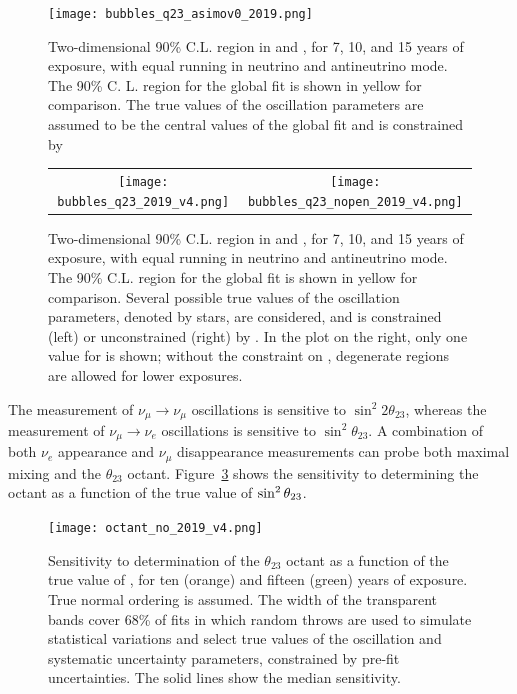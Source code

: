 \begin{figure}[h!]
    \centering
		\texttt{[image: bubbles\_q23\_asimov0\_2019.png]}
	\caption[Two-dimensional 90\% C.L. region in  and \deltacp]{Two-dimensional 90\% C.L. region in  and \deltacp, for 7, 10, and 15 years of exposure, with equal running in neutrino and antineutrino mode. The 90\% C. L. region for the  global fit is shown in yellow for comparison. The true values of the oscillation parameters are assumed to be the central values of the  global fit and  is constrained by }
    \label{fig:res_th23vdcp}
\end{figure}

\begin{figure}[h!]
    \centering
    \begin{tabular}{cc}
		\texttt{[image: bubbles\_q23\_2019\_v4.png]} &
		\texttt{[image: bubbles\_q23\_nopen\_2019\_v4.png]} 
	\end{tabular}  
	\caption[Two-dimensional 90\% C.L. region in  and \deltacp]{Two-dimensional 90\% C.L. region in  and \deltacp, for 7, 10, and 15 years of exposure, with equal running in neutrino and antineutrino mode. The 90\% C.L. region for the  global fit is shown in yellow for comparison. Several possible true values of the oscillation parameters, denoted by stars, are considered, and  is constrained (left) or unconstrained (right) by . In the plot on the right, only one value for  is shown; without the constraint on , degenerate regions are allowed for lower exposures.}
    \label{fig:res_th23vdcp_degen}
\end{figure}

The measurement of $\nu_\mu \rightarrow \nu_\mu$ oscillations is sensitive to $\sin ^2 2 \theta_{23}$, whereas the measurement of $\nu_\mu \rightarrow \nu_e$ oscillations is sensitive to $\sin^2 \theta_{23}$.  A combination of both $\nu_e$ appearance and $\nu_\mu$ disappearance measurements can probe both maximal mixing and
the $\theta_{23}$ octant.  
Figure~\ref{fig:lbloctant} shows the sensitivity to determining the octant as a function of the true value of $\sin^2\theta_{23}$.

\begin{figure}[h!]
    \centering
		\texttt{[image: octant\_no\_2019\_v4.png]}
	\caption[Sensitivity of determination of the $\theta_{23}$ octant as a function of ]{Sensitivity to determination of the $\theta_{23}$ octant as a function of the true value of , for ten (orange) and fifteen (green) years of exposure. True normal ordering is assumed. The width of the transparent bands cover 68\% of fits in which random throws are used to simulate statistical variations and select true values of the oscillation and systematic uncertainty parameters, constrained by pre-fit uncertainties. The solid lines show the median sensitivity.}
    \label{fig:lbloctant}
\end{figure}

